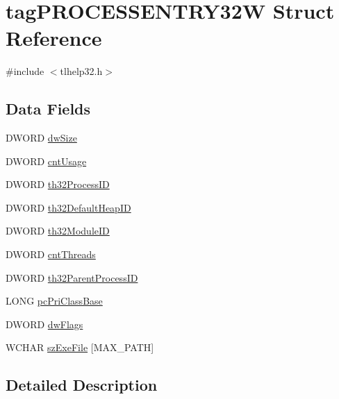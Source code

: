 \hypertarget{structtag_p_r_o_c_e_s_s_e_n_t_r_y32_w}{}\section{tag\+P\+R\+O\+C\+E\+S\+S\+E\+N\+T\+R\+Y32W Struct Reference}
\label{structtag_p_r_o_c_e_s_s_e_n_t_r_y32_w}


{\ttfamily \#include $<$tlhelp32.\+h$>$}

\subsection*{Data Fields}
\begin{DoxyCompactItemize}
\item 
D\+W\+O\+RD \hyperlink{structtag_p_r_o_c_e_s_s_e_n_t_r_y32_w_a669c5a85f5a9eb97e64ad880fadaaa2d}{dw\+Size}
\item 
D\+W\+O\+RD \hyperlink{structtag_p_r_o_c_e_s_s_e_n_t_r_y32_w_afd2d83c13a1e2ecb9f4878cd7a6d67bd}{cnt\+Usage}
\item 
D\+W\+O\+RD \hyperlink{structtag_p_r_o_c_e_s_s_e_n_t_r_y32_w_a4e94a85eb6671f7346bc1fb284f56186}{th32\+Process\+ID}
\item 
D\+W\+O\+RD \hyperlink{structtag_p_r_o_c_e_s_s_e_n_t_r_y32_w_af4b7c2295d859a589e5b20bc6241fc9e}{th32\+Default\+Heap\+ID}
\item 
D\+W\+O\+RD \hyperlink{structtag_p_r_o_c_e_s_s_e_n_t_r_y32_w_ac028c0e590bc5c6303111ccf82c25517}{th32\+Module\+ID}
\item 
D\+W\+O\+RD \hyperlink{structtag_p_r_o_c_e_s_s_e_n_t_r_y32_w_a916a91427773137e28e849e42e1737d7}{cnt\+Threads}
\item 
D\+W\+O\+RD \hyperlink{structtag_p_r_o_c_e_s_s_e_n_t_r_y32_w_afdd365893a3a70e962bd14106ca6906a}{th32\+Parent\+Process\+ID}
\item 
L\+O\+NG \hyperlink{structtag_p_r_o_c_e_s_s_e_n_t_r_y32_w_ad1c5175f80223fbd2dc54b134569ba4d}{pc\+Pri\+Class\+Base}
\item 
D\+W\+O\+RD \hyperlink{structtag_p_r_o_c_e_s_s_e_n_t_r_y32_w_a4d2f405b1141000eb2af256e0fc8b98b}{dw\+Flags}
\item 
W\+C\+H\+AR \hyperlink{structtag_p_r_o_c_e_s_s_e_n_t_r_y32_w_a8033179933bed45794a4cb9f90acf0cb}{sz\+Exe\+File} \mbox{[}M\+A\+X\+\_\+\+P\+A\+TH\mbox{]}
\end{DoxyCompactItemize}


\subsection{Detailed Description}


